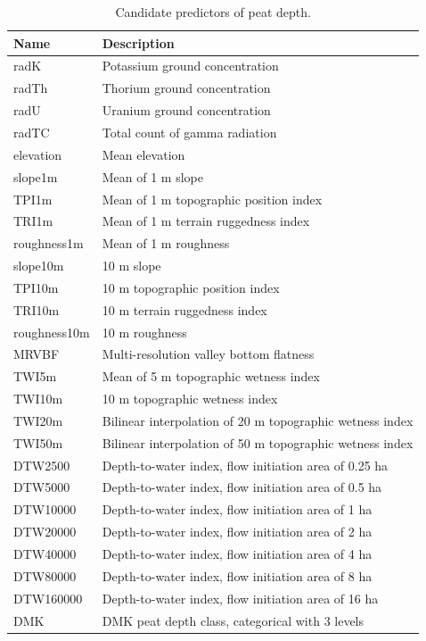 \documentclass[soil, manuscript]{copernicus}
\begin{document}
\begin{table}

\caption{\label{tab:preds}Candidate predictors of peat depth.}
\centering
\begin{tabular}[t]{ll}
\hline
Name & Description\\
\hline
radK & Potassium ground concentration\\
radTh & Thorium ground concentration\\
radU & Uranium ground concentration\\
radTC & Total count of gamma radiation\\
elevation & Mean elevation\\
slope1m & Mean of 1 m slope\\
TPI1m & Mean of 1 m topographic position index\\
TRI1m & Mean of 1 m terrain ruggedness index\\
roughness1m & Mean of 1 m roughness\\
slope10m & 10 m slope\\
TPI10m & 10 m topographic position index\\
TRI10m & 10 m terrain ruggedness index\\
roughness10m & 10 m roughness\\
MRVBF & Multi-resolution valley bottom flatness\\
TWI5m & Mean of 5 m topographic wetness index\\
TWI10m & 10 m topographic wetness index\\
TWI20m & Bilinear interpolation of 20 m topographic wetness index\\
TWI50m & Bilinear interpolation of 50 m topographic wetness index\\
DTW2500 & Depth-to-water index, flow initiation area of 0.25 ha\\
DTW5000 & Depth-to-water index, flow initiation area of 0.5 ha\\
DTW10000 & Depth-to-water index, flow initiation area of 1 ha\\
DTW20000 & Depth-to-water index, flow initiation area of 2 ha\\
DTW40000 & Depth-to-water index, flow initiation area of 4 ha\\
DTW80000 & Depth-to-water index, flow initiation area of 8 ha\\
DTW160000 & Depth-to-water index, flow initiation area of 16 ha\\
DMK & DMK peat depth class, categorical with 3 levels\\
\hline
\end{tabular}
\end{table}
\end{document}
